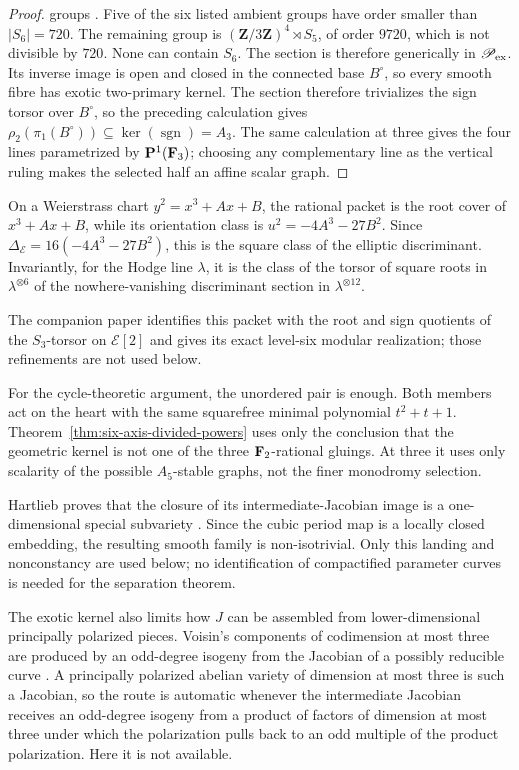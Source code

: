 \begin{proof}
groups \cite[Theorem~2.1]{Hartlieb}.  Five of the six listed ambient groups
have order smaller than \(|S_6|=720\).  The remaining group is
\((\mathbf Z/3\mathbf Z)^4\rtimes S_5\), of order \(9720\), which is not
divisible by \(720\).  None can contain \(S_6\).  The section is
therefore generically in \(\mathscr P_{\rm ex}\).  Its inverse image is open
and closed in the connected base \(B^\circ\), so every smooth fibre has
exotic two-primary kernel.  The section therefore trivializes the sign
torsor over \(B^\circ\), so the preceding calculation gives
\(\rho_2(\pi_1(B^\circ))\subseteq\ker(\operatorname{sgn})=A_3\).
The same calculation at three gives the four lines parametrized by
\(\mathbf P^1(\mathbf F_3)\); choosing any complementary line as the vertical ruling
makes the selected half an affine scalar graph.
\end{proof}

On a Weierstrass chart \(y^2=x^3+Ax+B\), the rational packet is the root
cover of \(x^3+Ax+B\), while its orientation class is
\(u^2=-4A^3-27B^2\).  Since
\(\Delta_{\mathcal E}=16(-4A^3-27B^2)\), this is the square class of the
elliptic discriminant.  Invariantly, for the Hodge line \(\lambda\), it is
the class of the torsor of square roots in \(\lambda^{\otimes6}\) of the
nowhere-vanishing discriminant section in \(\lambda^{\otimes12}\).

The companion paper \cite{RuddResolvent} identifies this packet with the root
and sign quotients of the \(S_3\)-torsor on \(\mathcal E[2]\) and gives its
exact level-six modular realization; those refinements are not used below.

For the cycle-theoretic argument, the unordered pair is enough.  Both members
act on the heart with the same squarefree minimal polynomial
\(t^2+t+1\).  Theorem~\ref{thm:six-axis-divided-powers} uses only the
conclusion that the geometric kernel is not one of the three
\(\mathbf F_2\)-rational gluings.  At three it uses only scalarity of the possible
\(A_5\)-stable graphs, not the finer monodromy selection.

Hartlieb proves that the closure of its intermediate-Jacobian image is a
one-dimensional special subvariety \cite[Proposition~5.7]{Hartlieb}.  Since the cubic period
map is a locally closed embedding, the resulting smooth family is
non-isotrivial.  Only this landing and nonconstancy are used below; no
identification of compactified parameter curves is needed for the separation
theorem.

The exotic kernel also limits how \(J\) can be assembled from
lower-dimensional principally polarized pieces.  Voisin's components of
codimension at most three are produced by an odd-degree isogeny from the
Jacobian of a possibly reducible curve \cite[proof of Theorem~4.5]{Voisin}.
A principally polarized abelian variety of dimension at most three is such a
Jacobian, so the route is automatic whenever the intermediate Jacobian
receives an odd-degree isogeny from a product of factors of dimension at most
three under which the polarization pulls back to an odd multiple of the
product polarization.  Here it is not available.

